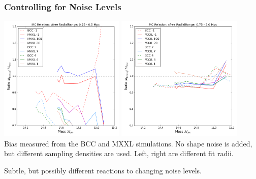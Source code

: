 \documentclass{beamer}
\begin{document}
\begin{frame}

\frametitle{Controlling for Noise Levels}
\centering

\includegraphics[width=0.45\textwidth]{../figures/density_cfree-r1}
\includegraphics[width=0.45\textwidth]{../figures/density_cfree-r10}\\
\tiny{
Bias measured from the BCC and MXXL simulations. No shape noise is added, but different sampling densities are used. Left, right are different fit radii.
}

\small{
Subtle, but possibly different reactions to changing noise levels.
}
\end{frame}

\end{document}
